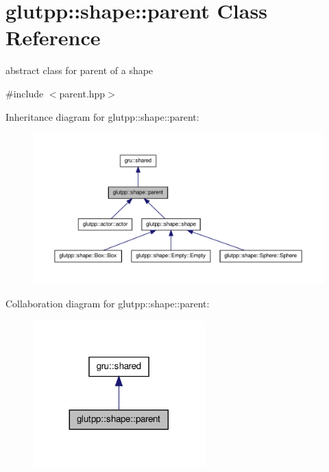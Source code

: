 \hypertarget{classglutpp_1_1shape_1_1parent}{\section{glutpp\-:\-:shape\-:\-:parent \-Class \-Reference}
\label{classglutpp_1_1shape_1_1parent}
}


abstract class for parent of a shape  




{\ttfamily \#include $<$parent.\-hpp$>$}



\-Inheritance diagram for glutpp\-:\-:shape\-:\-:parent\-:
\nopagebreak
\begin{figure}[H]
\begin{center}
\leavevmode
\includegraphics[width=350pt]{classglutpp_1_1shape_1_1parent__inherit__graph}
\end{center}
\end{figure}


\-Collaboration diagram for glutpp\-:\-:shape\-:\-:parent\-:\nopagebreak
\begin{figure}[H]
\begin{center}
\leavevmode
\includegraphics[width=188pt]{classglutpp_1_1shape_1_1parent__coll__graph}
\end{center}
\end{figure}
